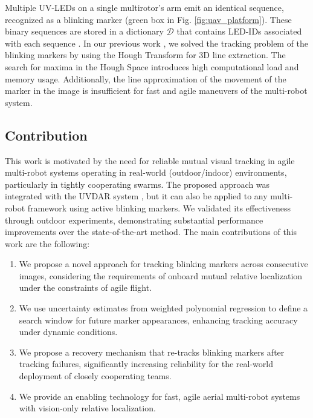 \documentclass[lettersize,preprint]{elsarticle}
\newcommand{\D}{$\mathcal{D}$}
\begin{document}
Multiple \gls{UV}-\glspl{LED} on a single multirotor's arm emit an identical sequence, recognized as a blinking marker (green box in Fig. \ref{fig:uav_platform}).
These binary sequences are stored in a dictionary \D{} that contains \gls{LED}-IDs associated with each sequence \cite{liceaOpticalCommunicationbasedIdentification2023}.
In our previous work \cite{walterMutualLocalizationUAVs2018}, we solved the tracking problem of the blinking markers by using the Hough Transform for 3D line extraction.
The search for maxima in the Hough Space introduces high computational load and memory usage. 
Additionally, the line approximation of the movement of the marker in the image is insufficient for fast and agile maneuvers of the multi-robot system.

\subsection{Contribution}\label{subsec:contribution}
This work is motivated by the need for reliable mutual visual tracking in agile multi-robot systems operating in real-world (outdoor/indoor) environments, particularly in tightly cooperating swarms.
The proposed approach was integrated with the \gls{UVDAR} system \cite{walterFastMutualRelative2018a}, but it can also be applied to any multi-robot framework using active blinking markers.
We validated its effectiveness through outdoor experiments, demonstrating substantial performance improvements over the state-of-the-art method.
The main contributions of this work are the following:
\begin{enumerate}
  \item We propose a novel approach for tracking blinking markers across consecutive images, considering the requirements of onboard mutual relative localization under the constraints of agile flight.
    \item We use uncertainty estimates from weighted polynomial regression to define a search window for future marker appearances, enhancing tracking accuracy under dynamic conditions.
    \item We propose a recovery mechanism that re-tracks blinking markers after tracking failures, significantly increasing reliability for the real-world deployment of closely cooperating teams.
    \item We provide an enabling technology for fast, agile aerial multi-robot systems with vision-only relative localization.
\end{enumerate}
\end{document}
